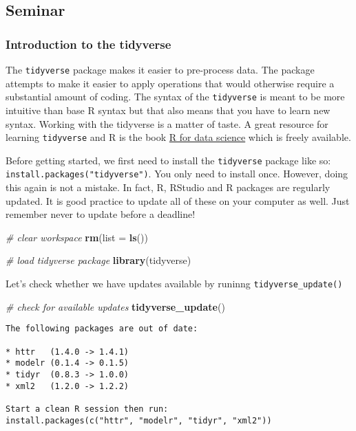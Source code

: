 \documentclass[]{article}
\newenvironment{Shaded}{\begin{snugshade}}{\end{snugshade}}
\newcommand{\CommentTok}[1]{\textcolor[rgb]{0.56,0.35,0.01}{\textit{#1}}}
\newcommand{\DataTypeTok}[1]{\textcolor[rgb]{0.13,0.29,0.53}{#1}}
\newcommand{\KeywordTok}[1]{\textcolor[rgb]{0.13,0.29,0.53}{\textbf{#1}}}
\newcommand{\NormalTok}[1]{#1}
\begin{document}
\hypertarget{seminar}{%
\subsection{Seminar}\label{seminar}}

\hypertarget{introduction-to-the-tidyverse}{%
\subsubsection{Introduction to the tidyverse}\label{introduction-to-the-tidyverse}}

The \texttt{tidyverse} package makes it easier to pre-process data. The package attempts to make it easier to apply operations that would otherwise require a substantial amount of coding. The syntax of the \texttt{tidyverse} is meant to be more intuitive than base R syntax but that also means that you have to learn new syntax. Working with the tidyverse is a matter of taste. A great resource for learning \texttt{tidyverse} and R is the book \href{https://r4ds.had.co.nz/}{R for data science} which is freely available.

Before getting started, we first need to install the \texttt{tidyverse} package like so: \texttt{install.packages("tidyverse")}. You only need to install once. However, doing this again is not a mistake. In fact, R, RStudio and R packages are regularly updated. It is good practice to update all of these on your computer as well. Just remember never to update before a deadline!

\begin{Shaded}
\begin{Highlighting}[]
\CommentTok{# clear workspace}
\KeywordTok{rm}\NormalTok{(}\DataTypeTok{list =} \KeywordTok{ls}\NormalTok{())}

\CommentTok{# load tidyverse package}
\KeywordTok{library}\NormalTok{(tidyverse)}
\end{Highlighting}
\end{Shaded}

Let's check whether we have updates available by runinng \texttt{tidyverse\_update()}

\begin{Shaded}
\begin{Highlighting}[]
\CommentTok{# check for available updates}
\KeywordTok{tidyverse_update}\NormalTok{()}
\end{Highlighting}
\end{Shaded}

\begin{verbatim}
The following packages are out of date:
  
* httr   (1.4.0 -> 1.4.1)
* modelr (0.1.4 -> 0.1.5)
* tidyr  (0.8.3 -> 1.0.0)
* xml2   (1.2.0 -> 1.2.2)

Start a clean R session then run:
install.packages(c("httr", "modelr", "tidyr", "xml2"))
\end{verbatim}
\end{document}
